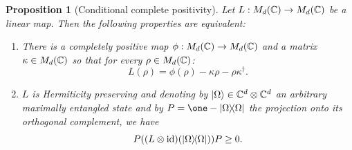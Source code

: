 \documentclass[11pt,a4paper]{article}
\theoremstyle{plain}
\newtheorem{proposition}{Proposition}
\begin{document}
\begin{proposition}[Conditional complete positivity]
    Let $L:M_d(\mathbb{C})\to M_d(\mathbb{C})$ be a linear map. Then the following properties are equivalent:
    \begin{enumerate}
        \item There is a completely positive map $\phi:M_d(\mathbb{C})\to M_d(\mathbb{C})$ and a matrix $\kappa\in M_d(\mathbb{C})$ so that for every $\rho\in M_d(\mathbb{C})$:
              \begin{equation}\label{eq:7.14}
                  L(\rho)=\phi(\rho)-\kappa\rho-\rho\kappa^{\dagger}.
              \end{equation}
        \item $L$ is Hermiticity preserving and denoting by $|\Omega\rangle\in\mathbb{C}^d\otimes\mathbb{C}^d$ an arbitrary maximally entangled state and by $P=\one-\ketbra{\Omega}{\Omega}$ the projection onto its orthogonal complement, we have
              \begin{equation}\label{eq:7.15}
                  P((L\otimes\mathrm{id})(|\Omega\rangle\!\langle\Omega|))P \ge 0.
              \end{equation}
    \end{enumerate}
\end{proposition}
\end{document}
